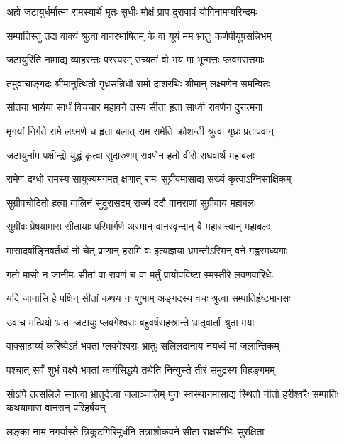 \twolineshloka
{अहो जटायुर्धर्मात्मा रामस्यार्थे मृतः सुधीः}
{मोक्षं प्राप दुरावापं योगिनामप्यरिन्दमः} %

\twolineshloka
{सम्पातिस्तु तदा वाक्यं श्रुत्वा वानरभाषितम्}
{के वा यूयं मम भ्रातुः कर्णपीयूषसन्निभम्} %

\twolineshloka
{जटायुरिति नामाद्य व्याहरन्तः परस्परम्}
{उच्यतां वो भयं मा भून्मत्तः प्लवगसत्तमाः} %

\twolineshloka
{तमुवाचाङ्गदः श्रीमानुत्थितो गृध्रसन्निधौ}
{रामो दाशरथिः श्रीमान् लक्ष्मणेन समन्वितः} %

\twolineshloka
{सीतया भार्यया सार्धं विचचार महावने}
{तस्य सीता हृता साध्वी रावणेन दुरात्मना} %

\twolineshloka
{मृगयां निर्गते रामे लक्ष्मणे च हृता बलात्}
{राम रामेति क्रोशन्ती श्रुत्वा गृध्रः प्रतापवान्} %

\twolineshloka
{जटायुर्नाम पक्षीन्द्रो युद्धं कृत्वा सुदारुणम्}
{रावणेन हतो वीरो राघवार्थं महाबलः} %

\twolineshloka
{रामेण दग्धो रामस्य सायुज्यमगमत् क्षणात्}
{रामः सुग्रीवमासाद्य सख्यं कृत्वाऽग्निसाक्षिकम्} %

\twolineshloka
{सुग्रीवचोदितो हत्वा वालिनं सुदुरासदम्}
{राज्यं ददौ वानराणां सुग्रीवाय महाबलः} %

\twolineshloka
{सुग्रीवः प्रेषयामास सीतायाः परिमार्गणे}
{अस्मान् वानरवृन्दान् वै महासत्त्वान् महाबलः} %

\twolineshloka
{मासादर्वाङ्निवर्तध्वं नो चेत् प्राणान् हरामि वः}
{इत्याज्ञया भ्रमन्तोऽस्मिन् वने गह्वरमध्यगाः} %

\twolineshloka
{गतो मासो न जानीमः सीतां वा रावणं च वा}
{मर्तुं प्रायोपविष्टा स्मस्तीरे लवणवारिधेः} %

\twolineshloka
{यदि जानासि हे पक्षिन् सीतां कथय नः शुभाम्}
{अङ्गदस्य वचः श्रुत्वा सम्पातिर्हृष्टमानसः} %

\twolineshloka
{उवाच मत्प्रियो भ्राता जटायुः प्लवगेश्वराः}
{बहुवर्षसहस्रान्ते भ्रातृवार्ता श्रुता मया} %

\twolineshloka
{वाक्साहाय्यं करिष्येऽहं भवतां प्लवगेश्वराः}
{भ्रातुः सलिलदानाय नयध्वं मां जलान्तिकम्} %

\twolineshloka
{पश्चात् सर्वं शुभं वक्ष्ये भवतां कार्यसिद्धये}
{तथेति निन्युस्ते तीरं समुद्रस्य विहङ्गमम्} %

\threelineshloka
{सोऽपि तत्सलिले स्नात्वा भ्रातुर्दत्त्वा जलाञ्जलिम्}
{पुनः स्वस्थानमासाद्य स्थितो नीतो हरीश्वरैः}
{सम्पातिः कथयामास वानरान् परिहर्षयन्} %

\twolineshloka
{लङ्का नाम नगर्यास्ते त्रिकूटगिरिमूर्धनि}
{तत्राशोकवने सीता राक्षसीभिः सुरक्षिता} %

